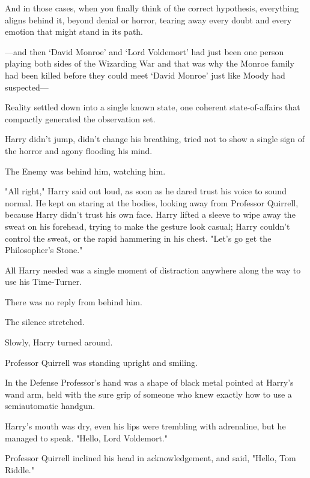 And in those cases, when you finally think of the correct hypothesis,
everything aligns behind it, beyond denial or horror, tearing away every doubt
and every emotion that might stand in its path.

—and then `David Monroe' and `Lord Voldemort' had just been one person
playing both sides of the Wizarding War and that was why the Monroe family had
been killed before they could meet `David Monroe' just like Moody had
suspected—

Reality settled down into a single known state, one coherent state-of-affairs
that compactly generated the observation set.

Harry didn't jump, didn't change his breathing, tried not to show a single sign
of the horror and agony flooding his mind.

The Enemy was behind him, watching him.

"All right," Harry said out loud, as soon as he dared trust his voice to sound
normal. He kept on staring at the bodies, looking away from Professor Quirrell,
because Harry didn't trust his own face. Harry lifted a sleeve to wipe away the
sweat on his forehead, trying to make the gesture look casual; Harry couldn't
control the sweat, or the rapid hammering in his chest. "Let's go get the
Philosopher's Stone."

All Harry needed was a single moment of distraction anywhere along the way to
use his Time-Turner.

There was no reply from behind him.

The silence stretched.

Slowly, Harry turned around.

Professor Quirrell was standing upright and smiling.

In the Defense Professor's hand was a shape of black metal pointed at Harry's
wand arm, held with the sure grip of someone who knew exactly how to use a
semiautomatic handgun.

Harry's mouth was dry, even his lips were trembling with adrenaline, but he
managed to speak. "Hello, Lord Voldemort."

Professor Quirrell inclined his head in acknowledgement, and said, "Hello, Tom
Riddle."
